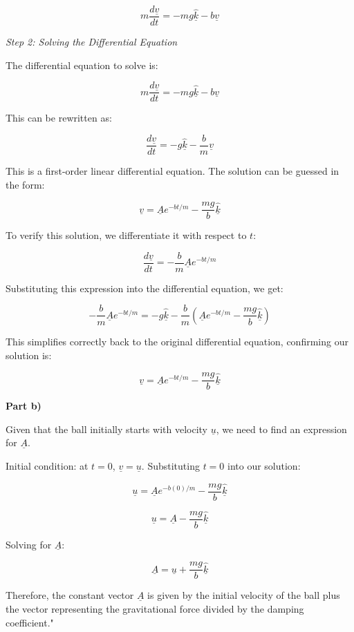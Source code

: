 \[ m\frac{d\underline{v}}{dt} = - mg \hat{\underline{k}} - b\underline{v} \]

\textit{Step 2: Solving the Differential Equation}

The differential equation to solve is:

\[ m\frac{d\underline{v}}{dt} = - mg \hat{\underline{k}} - b\underline{v} \]

This can be rewritten as:

\[ \frac{d\underline{v}}{dt} = - g \hat{\underline{k}} - \frac{b}{m}\underline{v} \]

This is a first-order linear differential equation. The solution can be guessed in the form:

\[ \underline{v} = \underline{A} e^{-bt/m} - \frac{mg}{b} \hat{\underline{k}} \]

To verify this solution, we differentiate it with respect to \(t\):

\[ \frac{d\underline{v}}{dt} = -\frac{b}{m} \underline{A} e^{-bt/m} \]

Substituting this expression into the differential equation, we get:

\[ -\frac{b}{m} \underline{A} e^{-bt/m} = - g \hat{\underline{k}} - \frac{b}{m}\left( \underline{A} e^{-bt/m} - \frac{mg}{b} \hat{\underline{k}} \right) \]

This simplifies correctly back to the original differential equation, confirming our solution is:

\[ \underline{v} = \underline{A} e^{-bt/m} - \frac{mg}{b} \hat{\underline{k}} \]

\textbf{Part b)}

Given that the ball initially starts with velocity \(\underline{u}\), we need to find an expression for \(\underline{A}\).

Initial condition: at \(t = 0\), \(\underline{v} = \underline{u}\). Substituting \(t = 0\) into our solution:

\[ \underline{u} = \underline{A} e^{-b(0)/m} - \frac{mg}{b} \hat{\underline{k}} \]

\[ \underline{u} = \underline{A} - \frac{mg}{b} \hat{\underline{k}} \]

Solving for \(\underline{A}\):

\[ \underline{A} = \underline{u} + \frac{mg}{b} \hat{\underline{k}} \]

Therefore, the constant vector \(\underline{A}\) is given by the initial velocity of the ball plus the vector representing the gravitational force divided by the damping coefficient."
